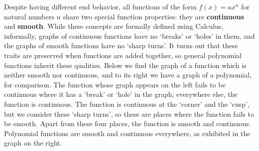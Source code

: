 \documentclass{ximera}
\begin{document}
Despite having different end behavior, all functions of the form $f(x) = ax^{n}$ for natural numbers $n$ share two special function properties:  they  are \textbf{continuous} and \textbf{smooth}.  While these concepts are formally defined using Calculus, informally, graphs of continuous functions have no `breaks' or `holes' in them, and the graphs of smooth functions have no `sharp turns'.  It turns out that these traits are preserved when functions are added together, so general polynomial functions inherit these qualities.  Below we find the graph of a function which is neither smooth nor continuous, and to its right we have a graph of a polynomial, for comparison.  The function whose graph appears on the left fails to be continuous where it has a `break' or `hole' in the graph;  everywhere else, the function is continuous.  The function is continuous at the `corner' and the `cusp', but we consider these `sharp turns', so these are places where the function fails to be smooth.  Apart from these four places, the function is smooth and continuous.  Polynomial functions are smooth and continuous everywhere, as exhibited in the graph on the right.
\end{document}
